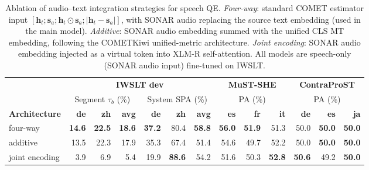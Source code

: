 \begin{table}[t]
\centering
\footnotesize
\setlength{\tabcolsep}{3pt}
\begin{tabular}{l|rrr|rrr|rrr|rrr}
\toprule
 & \multicolumn{6}{c|}{\textbf{IWSLT dev}} & \multicolumn{3}{c|}{\textbf{MuST-SHE}} & \multicolumn{3}{c}{\textbf{ContraProST}} \\
 & \multicolumn{3}{c|}{Segment $\tau_b$ (\%)} & \multicolumn{3}{c|}{System SPA (\%)} & \multicolumn{3}{c|}{PA (\%)} & \multicolumn{3}{c}{PA (\%)} \\
\cmidrule(lr){2-4}\cmidrule(lr){5-7}\cmidrule(lr){8-10}\cmidrule(lr){11-13}
\textbf{Architecture} & \textbf{de} & \textbf{zh} & \textbf{avg} & \textbf{de} & \textbf{zh} & \textbf{avg} & \textbf{es} & \textbf{fr} & \textbf{it} & \textbf{de} & \textbf{es} & \textbf{ja} \\
\midrule
four-way & \cellcolor[RGB]{183,224,223}\textbf{14.6} & \cellcolor[RGB]{183,224,223}\textbf{22.5} & \cellcolor[RGB]{183,224,223}\textbf{18.6} & \cellcolor[RGB]{183,224,223}\textbf{37.2} & \cellcolor[RGB]{211,236,235}80.4 & \cellcolor[RGB]{183,224,223}\textbf{58.8} & \cellcolor[RGB]{250,183,132}\textbf{56.0} & \cellcolor[RGB]{250,183,132}\textbf{51.9} & \cellcolor[RGB]{252,221,197}51.3 & \cellcolor[RGB]{255,255,255}50.0 & \cellcolor[RGB]{255,255,255}\textbf{50.0} & \cellcolor[RGB]{255,255,255}\textbf{50.0} \\
\midrule
additive & \cellcolor[RGB]{190,227,227}13.5 & \cellcolor[RGB]{184,224,224}22.3 & \cellcolor[RGB]{187,225,225}17.9 & \cellcolor[RGB]{191,227,227}35.3 & \cellcolor[RGB]{255,255,255}67.4 & \cellcolor[RGB]{255,255,255}51.4 & \cellcolor[RGB]{251,200,160}54.6 & \cellcolor[RGB]{255,255,255}49.7 & \cellcolor[RGB]{251,198,158}52.2 & \cellcolor[RGB]{255,255,255}50.0 & \cellcolor[RGB]{255,255,255}\textbf{50.0} & \cellcolor[RGB]{255,255,255}\textbf{50.0} \\
\midrule
joint encoding & \cellcolor[RGB]{255,255,255}3.9 & \cellcolor[RGB]{255,255,255}6.9 & \cellcolor[RGB]{255,255,255}5.4 & \cellcolor[RGB]{255,255,255}19.9 & \cellcolor[RGB]{183,224,223}\textbf{88.6} & \cellcolor[RGB]{227,243,242}54.2 & \cellcolor[RGB]{253,235,222}51.6 & \cellcolor[RGB]{254,243,235}50.3 & \cellcolor[RGB]{250,183,132}\textbf{52.8} & \cellcolor[RGB]{232,168,205}\textbf{50.6} & \cellcolor[RGB]{255,255,255}49.2 & \cellcolor[RGB]{255,255,255}\textbf{50.0} \\
\bottomrule
\end{tabular}
\caption{Ablation of audio--text integration strategies for speech QE. \emph{Four-way}: standard COMET estimator input $[\mathbf{h}_t; \mathbf{s}_a; \mathbf{h}_t \odot \mathbf{s}_a; |\mathbf{h}_t - \mathbf{s}_a|]$, with SONAR audio replacing the source text embedding (used in the main model). \emph{Additive}: SONAR audio embedding summed with the unified CLS MT embedding, following the COMETKiwi unified-metric architecture. \emph{Joint encoding}: SONAR audio embedding injected as a virtual token into XLM-R self-attention. All models are speech-only (SONAR audio input) fine-tuned on IWSLT.}\label{tab:harris_ablation}
\end{table}
